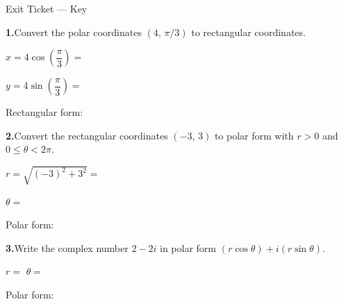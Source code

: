 \documentclass[10pt]{article}
\begin{document}
\namedateperiod

\vspace{0.12in}

\begin{notesbox}{Exit Ticket --- Key}

\textbf{1.}\quad Convert the polar coordinates $(4,\, \pi/3)$ to rectangular coordinates.

\vspace{6pt}
$x = 4\cos\!\left(\dfrac{\pi}{3}\right) = $ 

\vspace{8pt}
$y = 4\sin\!\left(\dfrac{\pi}{3}\right) = $ 

\vspace{6pt}
Rectangular form: 

\vspace{0.18in}
\textbf{2.}\quad Convert the rectangular coordinates $(-3,\, 3)$ to polar form
with $r > 0$ and $0 \le \theta < 2\pi$.

\vspace{6pt}
$r = \sqrt{(-3)^2 + 3^2} = $ 

\vspace{8pt}
$\theta = $ 

\vspace{6pt}
Polar form: 

\vspace{0.18in}
\textbf{3.}\quad Write the complex number $2 - 2i$ in polar form $(r\cos\theta) + i(r\sin\theta)$.

\vspace{6pt}
$r = $  \qquad
$\theta = $ \ans{$\arctan(-2/2) = -\pi/4$, or $7\pi/4$ in $[0,2\pi)$}

\vspace{6pt}
Polar form: 

\end{notesbox}
\end{document}

